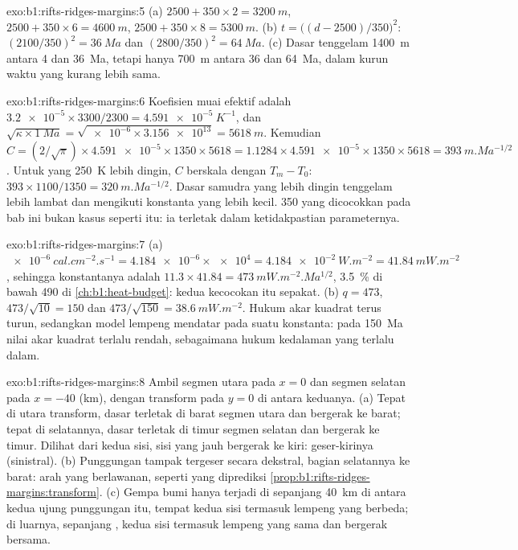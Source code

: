 \begin{solution}{exo:b1:rifts-ridges-margins:5}
(a) $2500 + 350\times2 = \qty{3200}{m}$, $2500 + 350\times6 = \qty{4600}{m}$,
$2500 + 350\times8 = \qty{5300}{m}$. (b) $t = \bigl((d - 2500)/350\bigr)^2$:
$(2100/350)^2 = \qty{36}{Ma}$ dan $(2800/350)^2 = \qty{64}{Ma}$. (c) Dasar tenggelam
\qty{1400}{m} antara 4 dan \qty{36}{Ma}, tetapi hanya \qty{700}{m} antara 36 dan
\qty{64}{Ma}, dalam kurun waktu yang kurang lebih sama.
\end{solution}

\begin{solution}{exo:b1:rifts-ridges-margins:6}
Koefisien muai efektif adalah
$\num{3.2e-5}\times3300/2300 = \qty{4.591e-5}{K^{-1}}$, dan
$\sqrt{\kappa\times\qty{1}{Ma}} = \sqrt{\num{e-6}\times\num{3.156e13}} =
\qty{5618}{m}$. Kemudian $C = (2/\sqrt\pi)\times\num{4.591e-5}\times1350\times5618 =
1.1284\times\num{4.591e-5}\times1350\times5618 = \qty{393}{m.Ma^{-1/2}}$. Untuk
 yang \qty{250}{K} lebih dingin, $C$ berskala dengan $T_m - T_0$:
$393\times1100/1350 = \qty{320}{m.Ma^{-1/2}}$. Dasar samudra yang lebih dingin
tenggelam lebih lambat dan mengikuti konstanta yang lebih kecil. \num{350} yang dicocokkan
pada bab ini bukan kasus seperti itu: ia terletak dalam ketidakpastian parameternya.
\end{solution}

\begin{solution}{exo:b1:rifts-ridges-margins:7}
(a) $\qty{e-6}{cal.cm^{-2}.s^{-1}} = \num{4.184e-6}\times\num{e4} =
\qty{4.184e-2}{W.m^{-2}} = \qty{41.84}{mW.m^{-2}}$, sehingga konstantanya adalah
$11.3\times41.84 = \qty{473}{mW.m^{-2}.Ma^{1/2}}$, \qty{3.5}{\percent} di bawah
490 di \cref{ch:b1:heat-budget}: kedua kecocokan itu sepakat. (b) $q = 473$,
$473/\sqrt{10} = 150$ dan $473/\sqrt{150} = \qty{38.6}{mW.m^{-2}}$. Hukum akar kuadrat
terus turun, sedangkan model lempeng mendatar pada suatu konstanta: pada
\qty{150}{Ma} nilai akar kuadrat terlalu rendah, sebagaimana hukum kedalaman yang
terlalu dalam.
\end{solution}

\begin{solution}{exo:b1:rifts-ridges-margins:8}
Ambil segmen utara pada $x = 0$ dan segmen selatan pada $x = -40$
(km), dengan transform pada $y = 0$ di antara keduanya. (a) Tepat di utara transform,
dasar terletak di barat segmen utara dan bergerak ke barat; tepat di selatannya, dasar
terletak di timur segmen selatan dan bergerak ke timur. Dilihat dari kedua sisi, sisi
yang jauh bergerak ke kiri: geser-kirinya (sinistral). (b) Punggungan tampak tergeser
secara dekstral, bagian selatannya ke barat: arah yang berlawanan, seperti yang
diprediksi \cref{prop:b1:rifts-ridges-margins:transform}. (c) Gempa bumi hanya terjadi
di sepanjang \qty{40}{km} di antara kedua ujung punggungan itu, tempat kedua sisi
termasuk lempeng yang berbeda; di luarnya, sepanjang , kedua sisi termasuk
lempeng yang sama dan bergerak bersama.
\end{solution}

